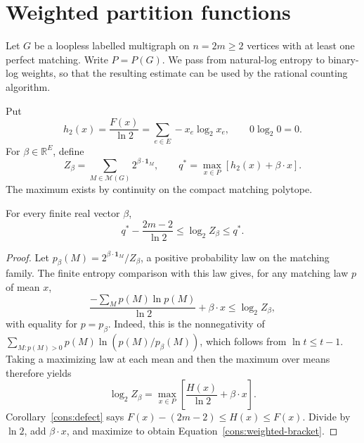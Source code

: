 \section{Weighted partition functions}\label{cons:weighted-section}
\label{d:sec-weighted-interface}

Let $G$ be a loopless labelled multigraph on $n=2m\ge2$ vertices with
at least one perfect matching. Write $P=P(G)$. We pass from natural-log
entropy to binary-log weights, so that the resulting estimate can be
used by the rational counting algorithm.

Put
\[
 h_2(x)=\frac{F(x)}{\ln2}=\sum_{e\in E}-x_e\log_2x_e,
 \qquad 0\log_2 0=0.
\]
For \(\beta\in\mathbb R^E\), define
\begin{equation}
 \label{cons:weighted-definitions}
 Z_\beta=\sum_{M\in\mathcal M(G)}2^{\beta\cdot\mathbf1_M},
 \qquad
 q^*=\max_{x\in P}
        [h_2(x)+\beta\cdot x].
\end{equation}
The maximum exists by continuity on the compact matching polytope.

\begin{corollary}
\label{cons:weighted}
For every finite real vector \(\beta\),
\begin{equation}
 \label{cons:weighted-bracket}
                q^*-\frac{2m-2}{\ln2}
                \le\log_2 Z_\beta\le q^*.
\end{equation}
\end{corollary}

\begin{proof}
Let \(p_\beta(M)=2^{\beta\cdot\mathbf1_M}/Z_\beta\), a positive
probability law on the matching family. The finite entropy comparison
with this law gives, for any matching law \(p\) of mean \(x\),
\[
 \frac{-\sum_Mp(M)\ln p(M)}{\ln2}+\beta\cdot x
                          \le\log_2 Z_\beta,
\]
with equality for \(p=p_\beta\). Indeed, this is the nonnegativity
of \(\sum_{M:p(M)>0}p(M)\ln(p(M)/p_\beta(M))\), which follows
from \(\ln t\le t-1\).
Taking a maximizing law at each mean and then the maximum over means
therefore yields
\begin{equation}
 \label{cons:variational}
 \log_2 Z_\beta
       =\max_{x\in P}\left[\frac{H(x)}{\ln2}+\beta\cdot x\right].
\end{equation}
Corollary~\ref{cons:defect} says
\(F(x)-(2m-2)\le H(x)\le F(x)\).
Divide by \(\ln2\), add \(\beta\cdot x\), and maximize to obtain
Equation~\eqref{cons:weighted-bracket}.
\end{proof}

